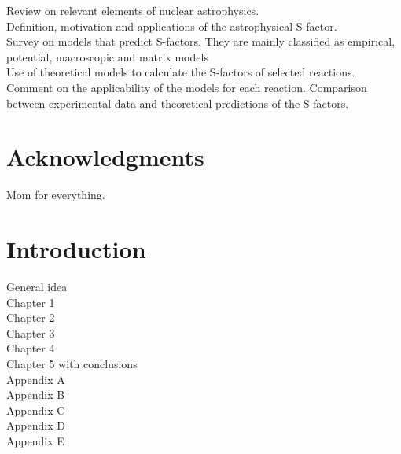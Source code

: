 \documentclass[openany]{book}
\begin{document}
Review on relevant elements of nuclear astrophysics. \\

Definition, motivation and applications of the astrophysical S-factor. \\

Survey on models that predict S-factors. They are mainly classified as empirical, potential, macroscopic and matrix models \\

Use of theoretical models to calculate the S-factors of selected reactions. \\

Comment on the applicability of the models for each reaction. Comparison between experimental data and theoretical predictions of the S-factors.

\clearpage

\chapter*{Acknowledgments}

Mom for everything.

\clearpage

\tableofcontents
\listoffigures
\listoftables



\chapter*{Introduction}

General idea\\ 

Chapter 1 \\

Chapter 2 \\

Chapter 3 \\

Chapter 4 \\

Chapter 5 with conclusions \\

Appendix A \\

Appendix B \\

Appendix C \\

Appendix D \\

Appendix E \\
\end{document}
